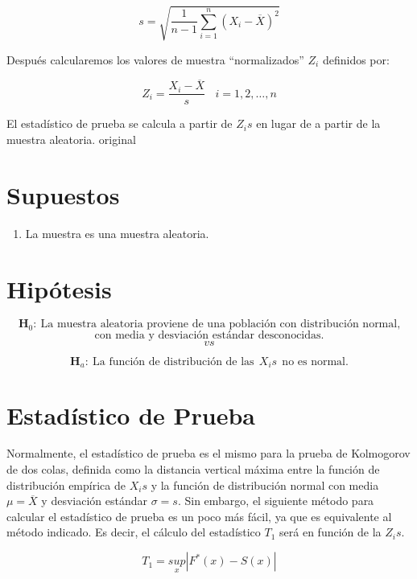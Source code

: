 \documentclass[
  a4paper,
  oneside,
  openany]{book}
\providecommand{\tightlist}{%
  \setlength{\itemsep}{0pt}\setlength{\parskip}{0pt}}
\begin{document}
\[s=\sqrt{\frac{1}{n-1}\sum_{i=1}^{n}(X_{i}-\overline{X})^2}\]

Después calcularemos los valores de muestra ``normalizados'' \(Z_{i}\) definidos por:

\[Z_{i}=\frac{X_{i}-\overline{X}}{s} \ \ \ \ i=1,2,\ldots,n\]

El estadístico de prueba se calcula a partir de \(Z_{i}s\) en lugar de a partir de la muestra aleatoria. original

\hypertarget{supuestos-14}{%
\section{Supuestos}\label{supuestos-14}}

\begin{enumerate}
\def\labelenumi{\arabic{enumi})}
\tightlist
\item
  La muestra es una muestra aleatoria.
\end{enumerate}

\hypertarget{hipuxf3tesis-16}{%
\section{Hipótesis}\label{hipuxf3tesis-16}}

\[\textbf{H}_0: \ \mbox{La muestra aleatoria proviene de una población con distribución normal,}\]
\[\mbox{con media y desviación estándar desconocidas.}\]
\[vs\]

\[\textbf{H}_a: \ \mbox{La función de distribución de las} \ \ X_{i}s \ \  \mbox{no es normal.}\]

\hypertarget{estaduxedstico-de-prueba-15}{%
\section{Estadístico de Prueba}\label{estaduxedstico-de-prueba-15}}

Normalmente, el estadístico de prueba es el mismo para la prueba de Kolmogorov de dos colas, definida como la distancia vertical máxima entre la función de distribución empírica de \(X_{i}s\) y la función de distribución normal con media \(\mu=\overline{X}\) y desviación estándar \(\sigma=s\).
Sin embargo, el siguiente método para calcular el estadístico de prueba es un poco más fácil, ya que es equivalente al método indicado. Es decir, el cálculo del estadístico \(T_{1}\) será en función de la \(Z_{i}s\).

\[T_{1}=\underset{x}{sup}|F^*(x)-S(x)|\]
\end{document}
